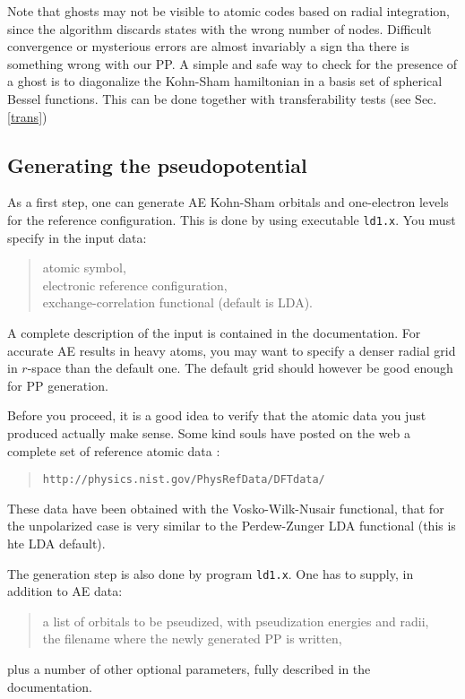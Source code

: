 \documentclass[12pt]{article}
\begin{document}
Note that ghosts may not be visible to atomic codes based on radial
integration, since the algorithm discards states with the wrong number 
of nodes. Difficult convergence or mysterious errors are almost invariably
a sign tha there is something wrong with our PP. 
A simple and safe way to check for the presence of a ghost is to diagonalize 
the Kohn-Sham hamiltonian in a basis set of spherical Bessel functions. 
This can be done together with transferability tests
(see Sec.\ref{trans})

\subsection{Generating the pseudopotential}

As a first step, one can generate AE Kohn-Sham orbitals and one-electron 
levels for the reference configuration. This is done by using executable
\texttt{ld1.x}. You must specify in the input data:
\begin{quote} 
atomic symbol,\\
electronic reference configuration,\\
exchange-correlation functional (default is LDA).\\
\end{quote}
A complete description of the input is contained in the documentation.
For accurate AE results in heavy atoms, you may want to specify a denser 
radial grid in $r$-space than the default one. The default grid should
however be good enough for PP generation.

Before you proceed, it is a good idea to verify that the atomic data
you just produced actually make sense. Some kind souls have posted on
the web a complete set of reference atomic data :
\begin{quote}
{\tt http://physics.nist.gov/PhysRefData/DFTdata/ }
\end{quote}
These data have been obtained with the Vosko-Wilk-Nusair functional,
that for the unpolarized case is very similar to the Perdew-Zunger 
LDA functional (this is hte LDA default).

The generation step is also done by program \texttt{ld1.x}.
One has to supply, in addition to AE data: 
\begin{quote}
a list of orbitals to be pseudized, with pseudization energies and radii,\\
the filename where the newly generated PP is written,\\
\end{quote}
plus a number of other optional parameters, 
fully described in the documentation.
\end{document}
